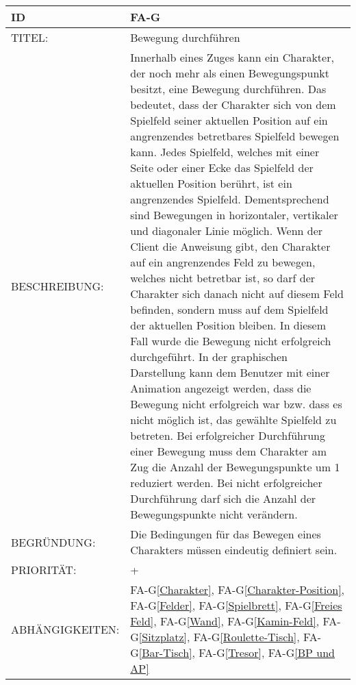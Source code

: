 \begin{tabularx}{16cm}{l|X}
	{table}\label{Bewegung durchfuehren}
	\textbf{ID} & \textbf{FA-G\arabic{table}} \\
	\hline
	TITEL: & Bewegung durchführen \\
	\hline
	BESCHREIBUNG: & Innerhalb eines Zuges kann ein Charakter, der noch mehr als einen Bewegungspunkt besitzt, eine Bewegung durchführen. Das bedeutet, dass der Charakter sich von dem Spielfeld seiner aktuellen Position auf ein angrenzendes betretbares Spielfeld bewegen kann. 
	Jedes Spielfeld, welches mit einer Seite oder einer Ecke das Spielfeld der aktuellen Position berührt, ist ein angrenzendes Spielfeld. Dementsprechend sind Bewegungen in horizontaler, vertikaler und diagonaler Linie möglich. 
	Wenn der Client die Anweisung gibt, den Charakter auf ein angrenzendes Feld zu bewegen, welches nicht betretbar ist, so darf der Charakter sich danach nicht auf diesem Feld befinden, sondern muss auf dem Spielfeld der aktuellen Position bleiben. In diesem Fall wurde die  Bewegung nicht erfolgreich durchgeführt. In der graphischen Darstellung kann dem Benutzer mit einer Animation angezeigt werden, dass die Bewegung nicht erfolgreich war bzw. dass es nicht möglich ist, das gewählte Spielfeld zu betreten. 
 Bei erfolgreicher Durchführung einer Bewegung muss dem Charakter am Zug die Anzahl der Bewegungspunkte um 1 reduziert werden. Bei nicht erfolgreicher Durchführung darf sich die Anzahl der Bewegungspunkte  nicht verändern.\\
	\hline
	BEGRÜNDUNG: & Die Bedingungen für das Bewegen eines Charakters müssen eindeutig definiert sein.\\
	\hline
	PRIORITÄT: & +\\
	\hline
	ABHÄNGIGKEITEN: & FA-G\ref{Charakter}, FA-G\ref{Charakter-Position}, FA-G\ref{Felder}, FA-G\ref{Spielbrett}, FA-G\ref{Freies Feld}, FA-G\ref{Wand}, FA-G\ref{Kamin-Feld}, FA-G\ref{Sitzplatz}, FA-G\ref{Roulette-Tisch}, FA-G\ref{Bar-Tisch}, FA-G\ref{Tresor}, FA-G\ref{BP und AP} \\
\end{tabularx}

